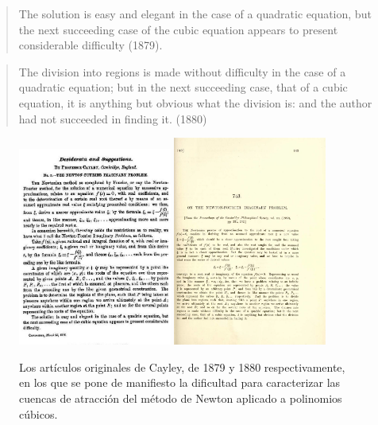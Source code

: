 
\begin{quote}
\guillemotleft The solution is easy and elegant in the case of a quadratic equation, but the next succeeding case of the cubic equation appears to present considerable difficulty (1879).\guillemotright
\end{quote}

\begin{quote}
\guillemotleft The division into regions is made without difficulty in the case of a quadratic equation; but in the next succeeding case, that of a cubic equation, it is anything but obvious what the division is: and the author had not succeeded in finding it. (1880)\guillemotright
\end{quote}




\begin{figure}[htb]
\centering
\includegraphics[width=0.45\textwidth]{Cayley1.jpg}
\qquad
 \includegraphics[width=0.45\textwidth]{Cayley2.pdf}
\caption{Los artículos originales de Cayley, de 1879 y 1880 respectivamente,  en los que se pone de manifiesto la dificultad para caracterizar las cuencas de atracción del método de Newton aplicado a polinomios cúbicos.}
 \label{esparam_fig0}
\end{figure}




